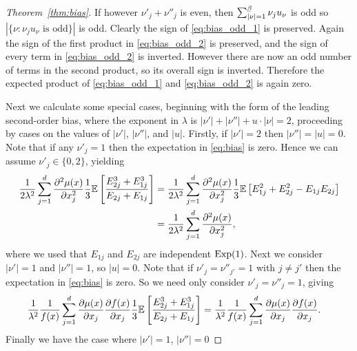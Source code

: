 \begin{proof}[Theorem~\ref{thm:bias}]
  If however $\nu'_j + \nu''_j$ is even, then
  $\sum_{|\nu|=1}^{\flbeta} \nu_j u_\nu$ is odd so
  $|\{\nu : \nu_j u_\nu \text{ is odd}\}|$ is odd.
  Clearly the sign of \eqref{eq:bias_odd_1} is preserved.
  Again the sign of the first product in \eqref{eq:bias_odd_2}
  is preserved, and the sign of every term in \eqref{eq:bias_odd_2}
  is inverted. However there are now an odd number of terms in the
  second product, so its overall sign is inverted.
  Therefore the expected product
  of \eqref{eq:bias_odd_1} and \eqref{eq:bias_odd_2} is again zero.


  Next we calculate some special cases, beginning with
  the form of the leading second-order bias,
  where the exponent in $\lambda$ is
  $|\nu'| + |\nu''| + u \cdot |\nu| = 2$,
  proceeding by cases on the values of $|\nu'|$, $|\nu''|$, and $|u|$.
  Firstly, if $|\nu'| = 2$ then $|\nu''| = |u| = 0$.
  Note that if any $\nu'_j = 1$ then the expectation in \eqref{eq:bias} is zero.
  Hence we can assume $\nu'_j \in \{0, 2\}$, yielding
  \begin{align*}
    \frac{1}{2 \lambda^2}
    \sum_{j=1}^d
    \frac{\partial^2 \mu(x)}{\partial x_j^2}
    \frac{1}{3}
    \mathbb{E} \left[
      \frac{E_{2j}^{3} + E_{1j}^{3}} {E_{2j} + E_{1j}}
    \right]
    &=
    \frac{1}{2 \lambda^2}
    \sum_{j=1}^d
    \frac{\partial^2 \mu(x)}{\partial x_j^2}
    \frac{1}{3}
    \mathbb{E} \left[
      E_{1j}^{2}
      + E_{2j}^{2}
      - E_{1j} E_{2j}
    \right] \\
    &=
    \frac{1}{2 \lambda^2}
    \sum_{j=1}^d
    \frac{\partial^2 \mu(x)}{\partial x_j^2},
  \end{align*}
  where we used that $E_{1j}$ and $E_{2j}$ are independent $\operatorname{Exp}(1)$.
  Next we consider $|\nu'| = 1$ and $|\nu''| = 1$, so $|u| = 0$.
  Note that if $\nu'_j = \nu''_{j'} = 1$ with $j \neq j'$ then the
  expectation in \eqref{eq:bias} is zero.
  So we need only consider $\nu'_j = \nu''_j = 1$, giving
  \begin{align*}
    \frac{1}{\lambda^2}
    \frac{1}{f(x)}
    \sum_{j=1}^{d}
    \frac{\partial \mu(x)}{\partial x_j}
    \frac{\partial f(x)}{\partial x_j}
    \frac{1}{3}
    \mathbb{E} \left[
      \frac{E_{2j}^{3} + E_{1j}^{3}}
      {E_{2j} + E_{1j}}
    \right]
    &=
    \frac{1}{\lambda^2}
    \frac{1}{f(x)}
    \sum_{j=1}^{d}
    \frac{\partial \mu(x)}{\partial x_j}
    \frac{\partial f(x)}{\partial x_j}.
  \end{align*}
  Finally we have the case where $|\nu'| = 1$, $|\nu''| = 0$

\end{proof}
